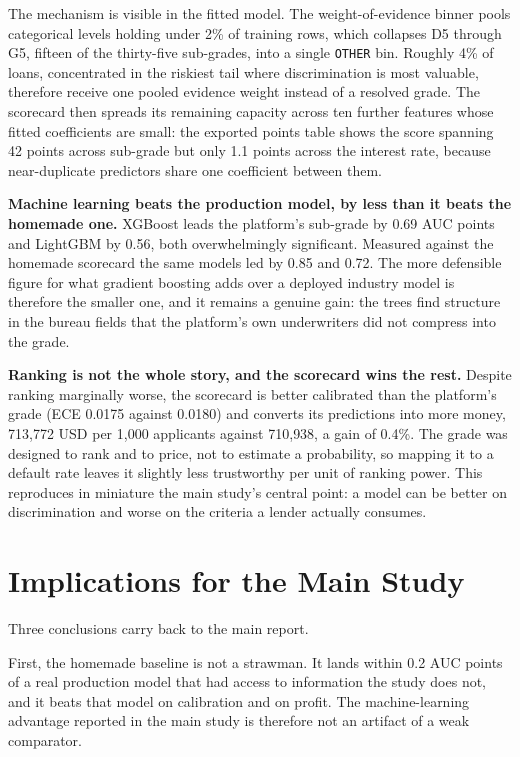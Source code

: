 \documentclass[a4paper,twocolumn,10pt]{article}
\begin{document}
The mechanism is visible in the fitted model. The weight-of-evidence binner pools categorical levels holding under 2\% of training rows, which collapses D5 through G5, fifteen of the thirty-five sub-grades, into a single \texttt{OTHER} bin. Roughly 4\% of loans, concentrated in the riskiest tail where discrimination is most valuable, therefore receive one pooled evidence weight instead of a resolved grade. The scorecard then spreads its remaining capacity across ten further features whose fitted coefficients are small: the exported points table shows the score spanning 42 points across sub-grade but only 1.1 points across the interest rate, because near-duplicate predictors share one coefficient between them.

\textbf{Machine learning beats the production model, by less than it beats the homemade one.} XGBoost leads the platform's sub-grade by 0.69 AUC points and LightGBM by 0.56, both overwhelmingly significant. Measured against the homemade scorecard the same models led by 0.85 and 0.72. The more defensible figure for what gradient boosting adds over a deployed industry model is therefore the smaller one, and it remains a genuine gain: the trees find structure in the bureau fields that the platform's own underwriters did not compress into the grade.

\textbf{Ranking is not the whole story, and the scorecard wins the rest.} Despite ranking marginally worse, the scorecard is better calibrated than the platform's grade (ECE 0.0175 against 0.0180) and converts its predictions into more money, 713{,}772 USD per 1{,}000 applicants against 710{,}938, a gain of 0.4\%. The grade was designed to rank and to price, not to estimate a probability, so mapping it to a default rate leaves it slightly less trustworthy per unit of ranking power. This reproduces in miniature the main study's central point: a model can be better on discrimination and worse on the criteria a lender actually consumes.

\section{Implications for the Main Study}

Three conclusions carry back to the main report.

First, the homemade baseline is not a strawman. It lands within 0.2 AUC points of a real production model that had access to information the study does not, and it beats that model on calibration and on profit. The machine-learning advantage reported in the main study is therefore not an artifact of a weak comparator.
\end{document}
